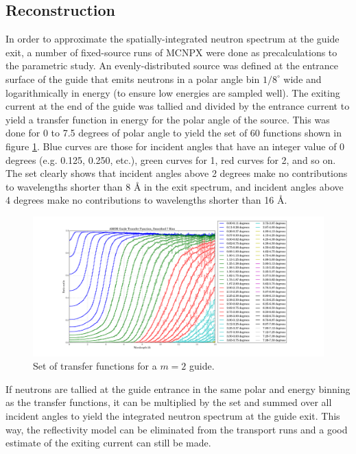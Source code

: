 \documentclass[a4paper]{jpconf}
\begin{document}
\subsection{Reconstruction}

In order to approximate the spatially-integrated neutron spectrum at the guide exit, a number of fixed-source runs of MCNPX were done as precalculations to the parametric study.  An evenly-distributed source was defined at the entrance surface of the guide that emits neutrons in a polar angle bin $1/8^\circ$ wide and logarithmically in energy (to ensure low energies are sampled well).  The exiting current at the end of the guide was tallied and divided by the entrance current to yield a transfer function in energy for the polar angle of the source.  This was done for 0 to 7.5 degrees of polar angle to yield the set of 60 functions shown in figure \ref{xfer_func}.  Blue curves are those for incident angles that have an integer value of 0 degrees (e.g. 0.125, 0.250, etc.), green curves for 1, red curves for 2, and so on.  The set clearly shows that incident angles above 2 degrees make no contributions to wavelengths shorter than 8 \AA{} in the exit spectrum, and incident angles above 4 degrees make no contributions to wavelengths shorter than 16 \AA{}. 

\begin{figure}
\begin{center}
\includegraphics[scale=0.3,trim={2cm 1.7cm 1.8cm 0.8cm},clip]{graphics/xfer_func.pdf}
\end{center}
\caption{\label{xfer_func}Set of transfer functions for a $m=2$ guide.}
\end{figure}

If neutrons are tallied at the guide entrance in the same polar and energy binning as the transfer functions, it can be multiplied by the set and summed over all incident angles to yield the integrated neutron spectrum at the guide exit.  This way, the reflectivity model can be eliminated from the transport runs and a good estimate of the exiting current can still be made.
\end{document}
